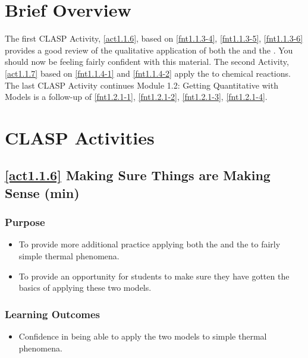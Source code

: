 \section*{Brief Overview}

The first CLASP Activity, \ref{act1.1.6}, based on \ref{fnt1.1.3-4}, \ref{fnt1.1.3-5}, \ref{fnt1.1.3-6} provides a good review of the qualitative application of both the \ThreePhaseModel{} and the \EnergyInteractionModel{}. You should now be feeling fairly confident with this material. The second Activity, \ref{act1.1.7} based on \ref{fnt1.1.4-1} and \ref{fnt1.1.4-2} apply the \EnergyInteractionModel{} to chemical reactions. The last CLASP Activity continues Module 1.2: Getting Quantitative with Models is a follow-up of \ref{fnt1.2.1-1}, \ref{fnt1.2.1-2}, \ref{fnt1.2.1-3}, \ref{fnt1.2.1-4}.
	
\section*{CLASP Activities}
	
\subsection*{\ref{act1.1.6} Making Sure Things are Making Sense	(\about\unit[35]{min})}
	
\subsubsection*{Purpose}

\begin{itemize}
	\item To provide more additional practice applying both the \ThreePhaseModel{} and the \EnergyInteractionModel{} to fairly simple thermal phenomena.
	\item To provide an opportunity for students to make sure they have gotten the basics of applying these two models.
\end{itemize}

\subsubsection*{Learning Outcomes}
\begin{itemize}
	\item Confidence in being able to apply the two models to simple thermal phenomena.
\end{itemize}

